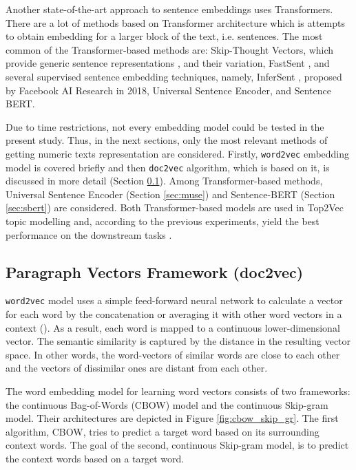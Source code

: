 \documentclass[fontsize=12pt,a4paper,twoside,openany]{scrbook}
\begin{document}
Another state-of-the-art approach to sentence embeddings uses Transformers. There are a lot of methods based on Transformer architecture which is attempts to obtain embedding for a larger block of the text, i.e. sentences. The most common of the Transformer-based methods are: Skip-Thought Vectors, which provide generic sentence representations \parencite{Kiros15}, and their variation, FastSent \parencite{Hill16}, and several supervised sentence embedding techniques, namely, InferSent \parencite{Conneau17}, proposed by Facebook AI Research in 2018, Universal Sentence Encoder, and Sentence BERT.

Due to time restrictions, not every embedding model could be tested in the present study. Thus, in the next sections, only the most relevant methods of getting numeric texts representation are considered. Firstly, \verb|word2vec| embedding model is covered briefly and then \verb|doc2vec| algorithm, which is based on it, is discussed in more detail (Section \ref{sec:doc2vec}). Among Transformer-based methods, Universal Sentence Encoder (Section \ref{sec:muse}) and Sentence-BERT (Section \ref{sec:sbert}) are considered. Both Transformer-based models are used in Top2Vec topic modelling and, according to the previous experiments, yield the best performance on the downstream tasks \parencite{Wang20}.

\subsection{Paragraph Vectors Framework (doc2vec)}
\label{sec:doc2vec}

\verb|word2vec| model uses a simple feed-forward neural network to calculate a vector for each word by the concatenation or averaging it with other word vectors in a context (). As a result, each word is mapped to a continuous lower-dimensional vector. The semantic similarity is captured by the distance in the resulting vector space. In other words, the word-vectors of similar words are close to each other and the vectors of dissimilar ones are distant from each other.

The word embedding model for learning word vectors consists of two frameworks: the continuous Bag-of-Words (CBOW) model and the continuous Skip-gram model. Their architectures are depicted in Figure \ref{fig:cbow_skip_gr}. The first algorithm, CBOW, tries to predict a target word based on its surrounding context words. The goal of the second, continuous Skip-gram model, is to predict the context words based on a target word.
\end{document}
